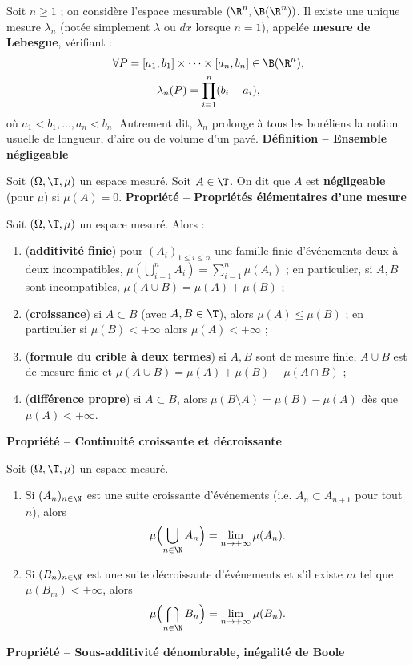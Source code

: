 Soit $n\ge1$ ; on considère l’espace mesurable $(\R^n,\B(\R^n))$. Il existe une unique mesure $\lambda_n$ (notée simplement $\lambda$ ou $dx$ lorsque $n=1$), appelée \textbf{mesure de Lebesgue}, vérifiant :
\[
\begin{gathered}
\forall P=[a_1,b_1]\times\cdots\times[a_n,b_n]\in\B(\R^n),\\
\lambda_n(P)=\prod_{i=1}^n(b_i-a_i),
\end{gathered}
\]
où $a_1<b_1,\ldots,a_n<b_n$. Autrement dit, $\lambda_n$ prolonge à tous les boréliens la notion usuelle de longueur, d’aire ou de volume d’un pavé.
\textbf{Définition – Ensemble négligeable}

Soit $(\Omega,\T,\mu)$ un espace mesuré. Soit $A\in\T$. On dit que $A$ est \textbf{négligeable} (pour $\mu$) si $\mu(A)=0$.
\textbf{Propriété – Propriétés élémentaires d’une mesure}

Soit $(\Omega,\T,\mu)$ un espace mesuré. Alors :
\begin{enumerate}
\item (\textbf{additivité finie}) pour $(A_i)_{1\le i\le n}$ une famille finie d’événements deux à deux incompatibles, $\mu(\bigcup_{i=1}^n A_i)=\sum_{i=1}^n\mu(A_i)$ ; en particulier, si $A,B$ sont incompatibles, $\mu(A\cup B)=\mu(A)+\mu(B)$ ;
\item (\textbf{croissance}) si $A\subset B$ (avec $A,B\in\T$), alors $\mu(A)\le\mu(B)$ ; en particulier si $\mu(B)<+\infty$ alors $\mu(A)<+\infty$ ;
\item (\textbf{formule du crible à deux termes}) si $A,B$ sont de mesure finie, $A\cup B$ est de mesure finie et $\mu(A\cup B)=\mu(A)+\mu(B)-\mu(A\cap B)$ ;
\item (\textbf{différence propre}) si $A\subset B$, alors $\mu(B\setminus A)=\mu(B)-\mu(A)$ dès que $\mu(A)<+\infty$.
\end{enumerate}
\textbf{Propriété – Continuité croissante et décroissante}

Soit $(\Omega,\T,\mu)$ un espace mesuré.
\begin{enumerate}
\item Si $(A_n)_{n\in\N}$ est une suite croissante d’événements (i.e. $A_n\subset A_{n+1}$ pour tout $n$), alors
\[\mu\Bigl(\bigcup_{n\in\N} A_n\Bigr)=\lim_{n\to+\infty}\mu(A_n).\]
\item Si $(B_n)_{n\in\N}$ est une suite décroissante d’événements et s’il existe $m$ tel que $\mu(B_m)<+\infty$, alors
\[\mu\Bigl(\bigcap_{n\in\N} B_n\Bigr)=\lim_{n\to+\infty}\mu(B_n).\]
\end{enumerate}
\textbf{Propriété – Sous-additivité dénombrable, inégalité de Boole}

